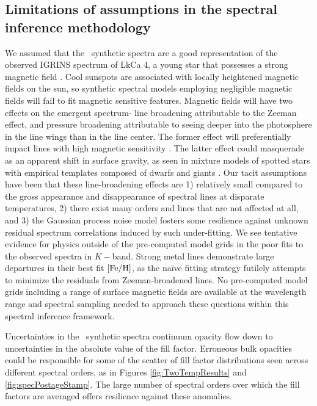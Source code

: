 \documentclass[twocolumn]{emulateapj}%
\begin{document}



\subsection{Limitations of assumptions in the spectral inference methodology}

We assumed that the \PHOENIX\ synthetic spectra are a good representation of the observed IGRINS spectrum of LkCa 4, a young star that possesses a strong magnetic field \citep{donati14}.  Cool sunspots are associated with locally heightened magnetic fields on the sun, so synthetic spectral models employing negligible magnetic fields will fail to fit magnetic sensitive features.  Magnetic fields will have two effects on the emergent spectrum- line broadening attributable to the Zeeman effect, and pressure broadening attributable to seeing deeper into the photosphere in the line wings than in the line center.  The former effect will preferentially impact lines with high magnetic sensitivity \citep[\emph{e.g.}][]{johnskrull99,deen13}.  The latter effect could masquerade as an apparent shift in surface gravity, as seen in mixture models of spotted stars with empirical templates composed of dwarfs and giants \citep{oneal96}.  Our tacit assumptions have been that these line-broadening effects are 1) relatively small compared to the gross appearance and disappearance of spectral lines at disparate temperatures, 2) there exist many orders and lines that are not affected at all, and 3) the Gaussian process noise model fosters some resilience against unknown residual spectrum correlations induced by such under-fitting.  We see tentative evidence for physics outside of the pre-computed model grids in the poor fits to the observed spectra in $K-$band.  Strong metal lines demonstrate large departures in their best fit $[{\rm Fe}/{\rm H}]$, as the na\"{i}ve fitting strategy futilely attempts to minimize the residuals from Zeeman-broadened lines.  No pre-computed model grids including a range of surface magnetic fields are available at the wavelength range and spectral sampling needed to approach these questions within this spectral inference framework.

Uncertainties in the \PHOENIX\ synthetic spectra continuum opacity flow down to uncertainties in the absolute value of the fill factor.  Erroneous bulk opacities could be responsible for some of the scatter of fill factor distributions seen across different spectral orders, as in Figures \ref{fig:TwoTempResults} and \ref{fig:specPostageStamp}.  The large number of spectral orders over which the fill factors are averaged offers resilience against these anomalies.
\end{document}
